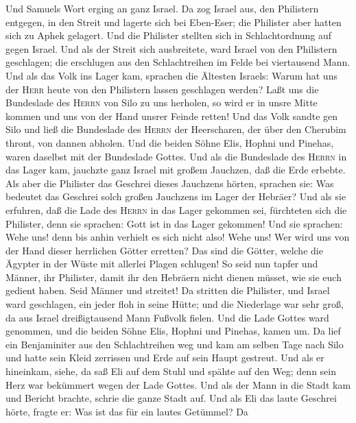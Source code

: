  Und Samuels Wort erging an ganz Israel. Da zog Israel
aus, den Philistern entgegen, in den Streit und lagerte sich bei
Eben-Eser; die Philister aber hatten sich zu Aphek gelagert.
 Und die Philister stellten sich in Schlachtordnung auf
gegen Israel. Und als der Streit sich ausbreitete, ward Israel von den
Philistern geschlagen; die erschlugen aus den Schlachtreihen im Felde
bei viertausend Mann.  Und als das Volk ins Lager kam,
sprachen die Ältesten Israels: Warum hat uns der \textsc{Herr} heute von
den Philistern lassen geschlagen werden? Laßt uns die Bundeslade des
\textsc{Herrn} von Silo zu uns herholen, so wird er in unsre Mitte
kommen und uns von der Hand unsrer Feinde retten!  Und das
Volk sandte gen Silo und ließ die Bundeslade des \textsc{Herrn} der
Heerscharen, der über den Cherubim thront, von dannen abholen. Und die
beiden Söhne Elis, Hophni und Pinehas, waren daselbst mit der Bundeslade
Gottes.  Und als die Bundeslade des \textsc{Herrn} in das
Lager kam, jauchzte ganz Israel mit großem Jauchzen, daß die Erde
erbebte.  Als aber die Philister das Geschrei dieses
Jauchzens hörten, sprachen sie: Was bedeutet das Geschrei solch großen
Jauchzens im Lager der Hebräer?  Und als sie erfuhren, daß
die Lade des \textsc{Herrn} in das Lager gekommen sei, fürchteten sich
die Philister, denn sie sprachen: Gott ist in das Lager gekommen! Und
sie sprachen: Wehe uns! denn bis anhin verhielt es sich nicht also!
 Wehe uns! Wer wird uns von der Hand dieser herrlichen
Götter erretten? Das sind die Götter, welche die Ägypter in der Wüste
mit allerlei Plagen schlugen!  So seid nun tapfer und
Männer, ihr Philister, damit ihr den Hebräern nicht dienen müsset, wie
sie euch gedient haben. Seid Männer und streitet!  Da
stritten die Philister, und Israel ward geschlagen, ein jeder floh in
seine Hütte; und die Niederlage war sehr groß, da aus Israel
dreißigtausend Mann Fußvolk fielen.  Und die Lade Gottes
ward genommen, und die beiden Söhne Elis, Hophni und Pinehas, kamen um.
 Da lief ein Benjaminiter aus den Schlachtreihen weg und
kam am selben Tage nach Silo und hatte sein Kleid zerrissen und Erde auf
sein Haupt gestreut.  Und als er hineinkam, siehe, da saß
Eli auf dem Stuhl und spähte auf den Weg; denn sein Herz war bekümmert
wegen der Lade Gottes. Und als der Mann in die Stadt kam und Bericht
brachte, schrie die ganze Stadt auf.  Und als Eli das
laute Geschrei hörte, fragte er: Was ist das für ein lautes Getümmel? Da
